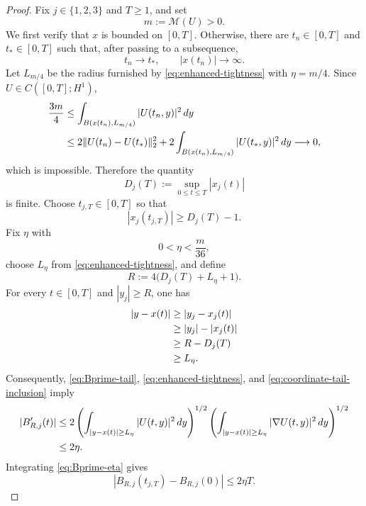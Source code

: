 \documentclass[preprint,12pt]{elsarticle}
\numberwithin{equation}{section}
\theoremstyle{remark}
\newcommand{\dd}{\,d}
\newcommand{\Mcal}{\mathcal M}
\begin{document}
\begin{proof}
Fix $j\in\{1,2,3\}$ and $T\ge1$, and set
\begin{equation*}
  m:=\Mcal(U)>0.
\end{equation*}
We first verify that $x$ is bounded on $[0,T]$. Otherwise, there are $t_n\in[0,T]$ and $t_*\in[0,T]$ such that, after passing to a subsequence,
\begin{equation*}
  t_n\to t_*,
  \qquad |x(t_n)|\to\infty.
\end{equation*}
Let $L_{m/4}$ be the radius furnished by \eqref{eq:enhanced-tightness} with $\eta=m/4$. Since $U\in C([0,T];H^1)$,
\begin{align*}
  \frac{3m}{4}
  &\le\int_{B(x(t_n),L_{m/4})}|U(t_n,y)|^2\dd y\notag\\
  &\le2\|U(t_n)-U(t_*)\|_2^2
  +2\int_{B(x(t_n),L_{m/4})}|U(t_*,y)|^2\dd y
  \longrightarrow0,
\end{align*}
which is impossible. Therefore the quantity
\begin{equation*}
  D_j(T):=\sup_{0\le t\le T}|x_j(t)|
\end{equation*}
is finite. Choose $t_{j,T}\in[0,T]$ so that
\begin{equation}\label{eq:Dj-almost-max}
  |x_j(t_{j,T})|\ge D_j(T)-1.
\end{equation}
Fix $\eta$ with
\begin{equation}\label{eq:eta-small-for-drift}
  0<\eta<\frac{m}{36},
\end{equation}
choose $L_\eta$ from \eqref{eq:enhanced-tightness}, and define
\begin{equation}\label{eq:R-barycenter-choice}
  R:=4\bigl(D_j(T)+L_\eta+1\bigr).
\end{equation}
For every $t\in[0,T]$ and $|y_j|\ge R$, one has
\begin{align}
  |y-x(t)|
  &\ge |y_j-x_j(t)|
\notag\\
  &\ge |y_j|-|x_j(t)|
\notag\\
  &\ge R-D_j(T)
\notag\\
  &\ge L_\eta.
  \label{eq:coordinate-tail-inclusion}
\end{align}
Consequently, \eqref{eq:Bprime-tail}, \eqref{eq:enhanced-tightness}, and \eqref{eq:coordinate-tail-inclusion} imply
\begin{align}
  |B_{R,j}'(t)|
  &\le2
  \left(\int_{|y-x(t)|\ge L_\eta}|U(t,y)|^2\dd y\right)^{1/2}
  \left(\int_{|y-x(t)|\ge L_\eta}|\nabla U(t,y)|^2\dd y\right)^{1/2}\notag\\
  &\le2\eta.
  \label{eq:Bprime-eta}
\end{align}
Integrating \eqref{eq:Bprime-eta} gives
\begin{equation}\label{eq:B-difference-small}
  |B_{R,j}(t_{j,T})-B_{R,j}(0)|\le2\eta T.
\end{equation}


\end{proof}
\end{document}
